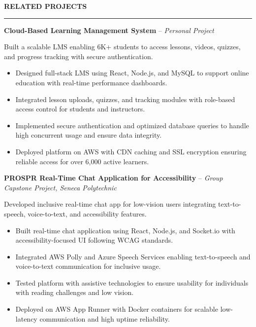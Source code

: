 \documentclass[10pt,letterpaper]{article}
\begin{document}
\vspace{6pt}

\textbf{RELATED PROJECTS}\\[-8pt]
\noindent\rule{\textwidth}{1pt}

\vspace{-2pt}

\textbf{Cloud-Based Learning Management System} -- \emph{Personal Project}

\vspace{-1pt}

Built a scalable LMS enabling 6K+ students to access lessons, videos, quizzes, and progress tracking with secure authentication.
\vspace{-1pt}
\begin{itemize}
\item Designed full-stack LMS using React, Node.js, and MySQL to support online education with real-time performance dashboards.
\item Integrated lesson uploads, quizzes, and tracking modules with role-based access control for students and instructors.
\item Implemented secure authentication and optimized database queries to handle high concurrent usage and ensure data integrity.
\item Deployed platform on AWS with CDN caching and SSL encryption ensuring reliable access for over 6,000 active learners.
\end{itemize}

\textbf{PROSPR  Real-Time Chat Application for Accessibility} -- \emph{Group Capstone Project, Seneca Polytechnic}

\vspace{-1pt}

Developed inclusive real-time chat app for low-vision users integrating text-to-speech, voice-to-text, and accessibility features.
\vspace{-1pt}
\begin{itemize}
\item Built real-time chat application using React, Node.js, and Socket.io with accessibility-focused UI following WCAG standards.
\item Integrated AWS Polly and Azure Speech Services enabling text-to-speech and voice-to-text communication for inclusive usage.
\item Tested platform with assistive technologies to ensure usability for individuals with reading challenges and low vision.
\item Deployed on AWS App Runner with Docker containers for scalable low-latency communication and high uptime reliability.
\end{itemize}
\end{document}
